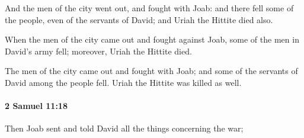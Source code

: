 			\begin{versebox}
					\item[BHS] 
					\item[ASV] And the men of the city went out, and fought with Joab: and there fell some of the people, even of the servants of David; and Uriah the Hittite died also.
					\item[NIV] When the men of the city came out and fought against Joab, some of the men in David’s army fell; moreover, Uriah the Hittite died.
					\item[NRSV] The men of the city came out and fought with Joab; and some of the servants of David among the people fell. Uriah the Hittite was killed as well.
			\end{versebox}

		\paragraph{2 Samuel 11:18} %
			\label{2SAMUEL-11-18}

			Then Joab sent and told David all the things concerning the war;


